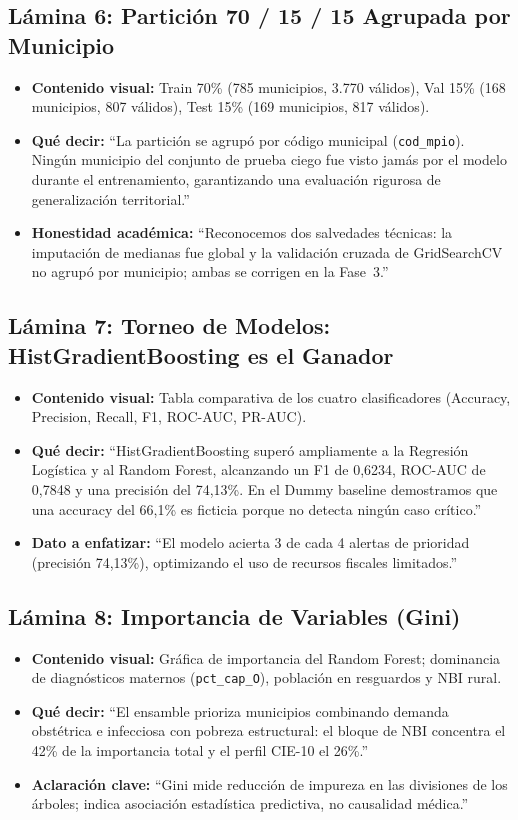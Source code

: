 \documentclass[11pt,a4paper]{article}
\newcommand{\code}[1]{\texttt{#1}}
\begin{document}
\subsection{Lámina 6: Partición 70 / 15 / 15 Agrupada por Municipio}
\begin{itemize}[leftmargin=*]
  \item \textbf{Contenido visual:} Train 70\% (785 municipios, 3.770 válidos), Val 15\% (168 municipios, 807 válidos), Test 15\% (169 municipios, 817 válidos).
  \item \textbf{Qué decir:} ``La partición se agrupó por código municipal (\code{cod_mpio}). Ningún municipio del conjunto de prueba ciego fue visto jamás por el modelo durante el entrenamiento, garantizando una evaluación rigurosa de generalización territorial.''
  \item \textbf{Honestidad académica:} ``Reconocemos dos salvedades técnicas: la imputación de medianas fue global y la validación cruzada de GridSearchCV no agrupó por municipio; ambas se corrigen en la Fase~3.''
\end{itemize}

\subsection{Lámina 7: Torneo de Modelos: HistGradientBoosting es el Ganador}
\begin{itemize}[leftmargin=*]
  \item \textbf{Contenido visual:} Tabla comparativa de los cuatro clasificadores (Accuracy, Precision, Recall, F1, ROC-AUC, PR-AUC).
  \item \textbf{Qué decir:} ``HistGradientBoosting superó ampliamente a la Regresión Logística y al Random Forest, alcanzando un F1 de 0,6234, ROC-AUC de 0,7848 y una precisión del 74,13\%. En el Dummy baseline demostramos que una accuracy del 66,1\% es ficticia porque no detecta ningún caso crítico.''
  \item \textbf{Dato a enfatizar:} ``El modelo acierta 3 de cada 4 alertas de prioridad (precisión 74,13\%), optimizando el uso de recursos fiscales limitados.''
\end{itemize}

\subsection{Lámina 8: Importancia de Variables (Gini)}
\begin{itemize}[leftmargin=*]
  \item \textbf{Contenido visual:} Gráfica de importancia del Random Forest; dominancia de diagnósticos maternos (\code{pct_cap_O}), población en resguardos y NBI rural.
  \item \textbf{Qué decir:} ``El ensamble prioriza municipios combinando demanda obstétrica e infecciosa con pobreza estructural: el bloque de NBI concentra el 42\% de la importancia total y el perfil CIE-10 el 26\%.''
  \item \textbf{Aclaración clave:} ``Gini mide reducción de impureza en las divisiones de los árboles; indica asociación estadística predictiva, no causalidad médica.''
\end{itemize}
\end{document}
